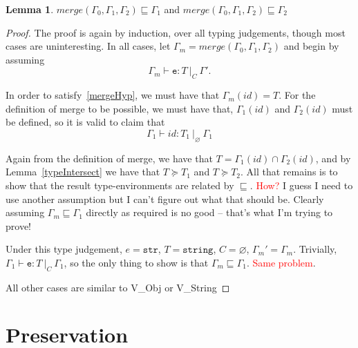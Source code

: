 \documentclass[a4paper]{article}
\theoremstyle{definition}
\theoremstyle{dotless}
\newtheorem{lemma}{Lemma}[section]
\begin{document}
\begin{lemma}\label{mergeEnv}
	$merge(\Gamma_0, \Gamma_1, \Gamma_2) \sqsubseteq \Gamma_1$ and 
	$merge(\Gamma_0, \Gamma_1, \Gamma_2) \sqsubseteq \Gamma_2$
\end{lemma}
\begin{proof}

  The proof is again by induction, over all typing judgements, though most cases are uninteresting.
  In all cases, let $\Gamma_m = merge(\Gamma_0, \Gamma_1, \Gamma_2)$ and begin by assuming 
  \begin{equation}
	\label{mergeHyp}
	\Gamma_m \vdash \mathtt{e} : T\ |_C\ \Gamma'.
  \end{equation}

  \begin{case}[IdType]
  	
  	In order to satisfy~\eqref{mergeHyp}, we must have that
  	$\Gamma_m(id) = T$. For the definition of merge to be possible, we must
  	have that, $\Gamma_1(id)$ and $\Gamma_2(id)$ must be defined, so it is
  	valid to claim that 
  	\begin{equation}
		\Gamma_1 \vdash id : T_1\ |_\varnothing\ \Gamma_1
  	\end{equation}

  	Again from the definition of merge, we have that
  	$T=\Gamma_1(id)\cap\Gamma_2(id)$, and by Lemma~\ref{typeIntersect} we have
  	that $T\succeq T_1$ and $T\succeq T_2$.  All that remains is to show that
  	the result type-environments are related by $\sqsubseteq$.
  	\textcolor{red}{How?} I guess I need to use another assumption but I can't
  	figure out what that should be. Clearly assuming $\Gamma_m \sqsubseteq
  	\Gamma_1$ directly as required is no good -- that's what I'm trying to
  	prove!
  
  \end{case}
  \begin{case}[V\_String]
  	
  	Under this type judgement, $e=\mathtt{str}$,
  	$T=\mathtt{string}$, $C=\varnothing$, $\Gamma_m'=\Gamma_m$.  Trivially,
  	$\Gamma_1 \vdash \mathtt{e} : T\ |_C\ \Gamma_1$, so the only thing to show
  	is that $\Gamma_m\sqsubseteq\Gamma_1$. \textcolor{red}{Same problem}.
  \end{case}

  \begin{case}[V\_Obj]
  \end{case}
	All other cases are similar to V\_Obj or V\_String
\end{proof}
\section{Preservation}
\end{document}
